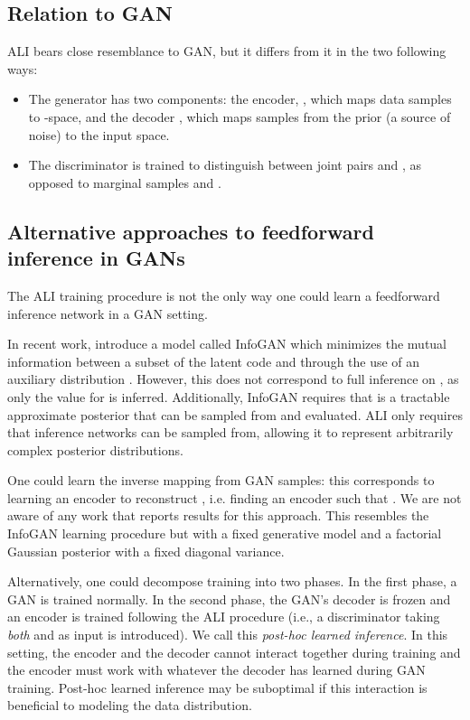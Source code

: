 \documentclass{article}
\begin{document}
\subsection{Relation to GAN}
ALI bears close resemblance to GAN, but it differs from it in the two following
ways:

\begin{itemize}
	\item The generator has two components: the encoder, , which
		maps data samples  to -space, and the decoder
		, which maps samples from the prior  (a source
		of noise) to the input space.
	\item The discriminator is trained to distinguish between joint pairs
		 and , as opposed to marginal samples  and .
\end{itemize}

\subsection{Alternative approaches to feedforward inference in GANs}
\label{sec:alternative}

The ALI training procedure is not the only way one could learn a feedforward
inference network in a GAN setting.

In recent work, \citet{chen2016infogan} introduce a model called InfoGAN which
minimizes the mutual information between a subset  of the latent code
and  through the use of an auxiliary distribution . However, this does not correspond to full inference on , as
only the value for  is inferred. Additionally, InfoGAN requires that
 is a tractable approximate posterior that can be sampled
from and evaluated. ALI only requires that inference networks can be sampled
from, allowing it to represent arbitrarily complex posterior distributions.

One could learn the inverse mapping from GAN samples: this corresponds to
learning an encoder to reconstruct , i.e. finding an encoder such that
. We are not aware
of any work that reports results for this approach. This resembles the InfoGAN
learning procedure but with a fixed generative model and a factorial Gaussian
posterior with a fixed diagonal variance.

Alternatively, one could decompose training into two phases. In the first phase,
a GAN is trained normally. In the second phase, the GAN's decoder is frozen and
an encoder is trained following the ALI procedure (i.e., a discriminator taking
{\em both}  and  as input is introduced). We call this {\em
post-hoc learned inference}. In this setting, the encoder and the decoder cannot
interact together during training and the encoder must work with whatever the
decoder has learned during GAN training. Post-hoc learned inference may be
suboptimal if this interaction is beneficial to modeling the data distribution.
\end{document}
